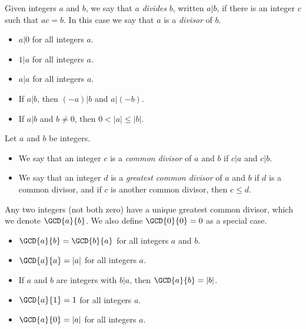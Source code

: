 \documentclass{article}
\begin{document}

\begin{dfn}[Divides]
Given integers $a$ and $b$, we say that $a$ \emph{divides} $b$, written $a|b$, if there is an integer $c$ such that $ac = b$. In this case we say that $a$ is a \emph{divisor} of $b$.
\end{dfn}

\begin{prop} \mbox{}
\begin{itemize}
\item $a|0$ for all integers $a$.
\item $1|a$ for all integers $a$.
\item $a|a$ for all integers $a$.
\item If $a|b$, then $(-a)|b$ and $a|(-b)$.
\item If $a|b$ and $b \neq 0$, then $0 < |a| \leq |b|$.
\end{itemize}
\end{prop}

\begin{dfn}
Let $a$ and $b$ be integers.
\begin{itemize}
\item We say that an integer $c$ is a \emph{common divisor} of $a$ and $b$ if $c|a$ and $c|b$.
\item We say that an integer $d$ is a \emph{greatest common divisor} of $a$ and $b$ if $d$ is a common divisor, and if $c$ is another common divisor, then $c \leq d$.
\end{itemize}
\end{dfn}

\begin{prop}
Any two integers (not both zero) have a unique greatest common divisor, which we denote $\GCD{a}{b}$. We also define $\GCD{0}{0} = 0$ as a special case.
\end{prop}

\begin{prop} \mbox{}
\begin{itemize}
\item $\GCD{a}{b} = \GCD{b}{a}$ for all integers $a$ and $b$.
\item $\GCD{a}{a} = |a|$ for all integers $a$.
\item If $a$ and $b$ are integers with $b|a$, then $\GCD{a}{b} = |b|$.
\item $\GCD{a}{1} = 1$ for all integers $a$.
\item $\GCD{a}{0} = |a|$ for all integers $a$.
\end{itemize}
\end{prop}
\end{document}
